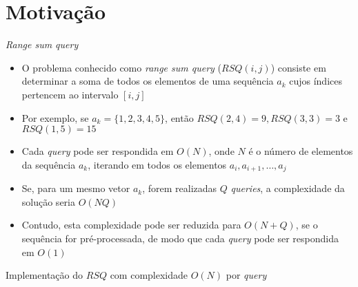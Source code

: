 \section{Motivação}

\begin{frame}[fragile]{\it {Range sum query}}

    \begin{itemize}
        \item O problema conhecido como \textit{range sum query} ($RSQ(i, j)$) consiste em 
            determinar a 
            soma de todos os elementos de uma sequência $a_k$ cujos índices pertencem ao
            intervalo $[i, j]$

        \item Por exemplo, se $a_k = \lbrace 1, 2, 3, 4, 5\rbrace$, então $RSQ(2, 4) = 9,
            RSQ(3, 3) = 3$ e $RSQ(1, 5) = 15$

        \item Cada \textit{query} pode ser respondida em $O(N)$, onde $N$ é o número de elementos
            da sequência $a_k$, iterando em todos os elementos $a_i, a_{i + 1}, \ldots, a_j$

        \item Se, para um mesmo vetor $a_k$, forem realizadas $Q$ \textit{queries}, a complexidade
            da solução seria $O(NQ)$

        \item Contudo, esta complexidade pode ser reduzida para $O(N + Q)$, se o sequência 
            for pré-processada, de modo que cada \textit{query} pode ser respondida em $O(1)$

    \end{itemize}

\end{frame}

\begin{frame}[fragile]{Implementação do $RSQ$ com complexidade $O(N)$ por {\it query}}
\end{frame}


